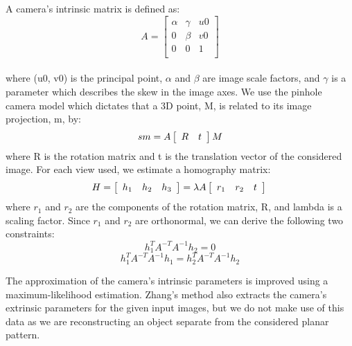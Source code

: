 A camera’s intrinsic matrix is defined as:\\
\[
   A =
  \left[ {\begin{array}{ccc}
   \alpha & \gamma & u0  \\
   0 & \beta & v0 \\
   0 & 0 & 1 \\
  \end{array} } \right]
\] \\
where (u0, v0) is the principal point, $\alpha$ and $\beta$ are image scale factors, and $\gamma$ is a parameter which describes the skew in the image axes. We use the pinhole camera model which dictates that a 3D point, M, is related to its image projection, m, by:
\begin{equation}
  sm = A
  \left[ {\begin{array}{cc}
   R & t \\
  \end{array} } \right]
  M \\
\end{equation}
where R is the rotation matrix and t is the translation vector of the considered image. 
For each view used, we estimate a homography matrix:
\begin{equation}
  H =
  \left[ {\begin{array}{ccc}
   h_1 & h_2 & h_3 \\
  \end{array} } \right]
  = \lambda  A
  \left[ {\begin{array}{ccc}
   r_1 & r_2 & t \\
  \end{array} } \right]
  \\
\end{equation}
where $r_1$ and $r_2$ are the components of the rotation matrix, R, and lambda is a scaling factor.  Since $r_1$ and $r_2$ are orthonormal, we can derive the following two constraints:
\begin{equation}
  h_1^T A^{-T} A^{-1} h_2 = 0
\end{equation}
\begin{equation}
  h_1^T A^{-T} A^{-1} h_1 = h_2^T A^{-T} A^{-1} h_2
\end{equation}

The approximation of the camera’s intrinsic parameters is improved using a maximum-likelihood estimation. Zhang's method also extracts the camera’s extrinsic parameters for the given input images, but we do not make use of this data as we are reconstructing an object separate from the considered planar pattern. 
